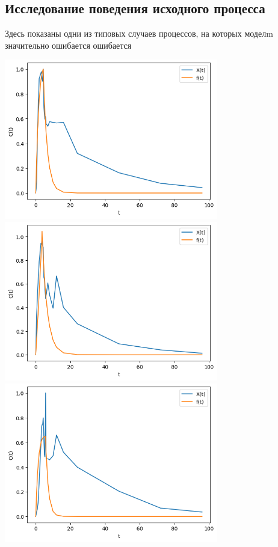 \documentclass{article}
\begin{document}
\subsection{Исследование поведения исходного процесса}

Здесь показаны одни из типовых случаев процессов, на которых моделm значительно ошибается ошибается

\includegraphics[width=0.7\textwidth, left]{example4.png}
\includegraphics[width=0.7\textwidth, left]{example5.png}
\includegraphics[width=0.7\textwidth, left]{example6.png}
\end{document}
